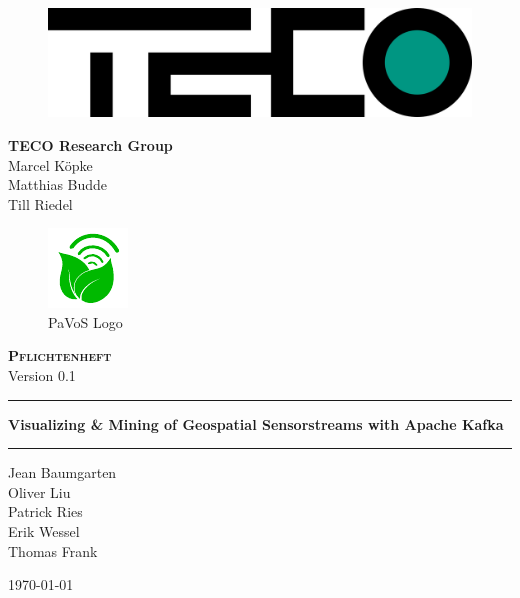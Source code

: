 \begin{titlepage}
	\begin{center}
	
	\begin{figure}[H]
	\centering
	\includegraphics[width=0.5\linewidth]{images/TECOLogo.png}\\[0.2cm]
	\end{figure}

	\textbf{TECO Research Group}\\[0.2cm]
	Marcel Köpke\\Matthias Budde\\Till Riedel\\
	\vspace{1cm}
	
	\begin{figure}[H]
	\centering
	\includegraphics[width=0.25\linewidth]{images/PaVoSLogo}
	\captionsetup{labelformat=empty}
	\caption{PaVoS Logo}
	\end{figure}
	
	\textsc{\textbf{\LARGE Pflichtenheft}}\\
	{\small Version 0.1}\\
	
	\vspace{1cm}\hrule\vspace{0.4cm}
	\textbf{\huge Visualizing \& Mining of Geospatial Sensorstreams with Apache Kafka}\\
	\vspace{0.4cm}\hrule\vspace{1cm}
	
	{\Large Jean Baumgarten\\
	Oliver Liu\\
	Patrick Ries\\
	Erik Wessel\\
	Thomas Frank\\}
	\vspace{2cm}

	\today
	
	\end{center}
\end{titlepage}